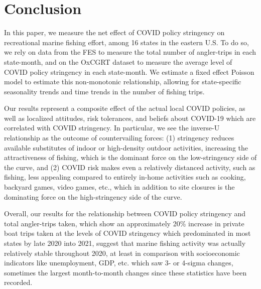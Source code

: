 \documentclass[12pt]{article}
\begin{document}
\section{Conclusion}

In this paper, we measure the net effect of COVID policy stringency on
recreational marine fishing effort, among 16 states in the eastern U.S.
To do so, we rely on data from the FES to measure the total number of
angler-trips in each state-month, and on the OxCGRT dataset to measure
the average level of COVID policy stringency in each state-month. We
estimate a fixed effect Poisson model to estimate this non-monotonic
relationship, allowing for state-specific seasonality trends and time
trends in the number of fishing trips.

Our results represent a composite effect of the actual local COVID
policies, as well as localized attitudes, risk tolerances, and beliefs
about COVID-19 which are correlated with COVID stringency. In
particular, we see the inverse-U relationship as the outcome of
countervailing forces: (1) stringency reduces available substitutes of
indoor or high-density outdoor activities, increasing the attractiveness
of fishing, which is the dominant force on the low-stringency side of
the curve, and (2) COVID risk makes even a relatively distanced
activity, such as fishing, less appealing compared to entirely in-home
activities such as cooking, backyard games, video games, etc., which in
addition to site closures is the dominating force on the high-stringency
side of the curve.

Overall, our results for the relationship between COVID policy
stringency and total angler-trips taken, which show an approximately
20\% increase in private boat trips taken at the levels of COVID
stringency which predominated in most states by late 2020 into 2021,
suggest that marine fishing activity was actually relatively stable
throughout 2020, at least in comparison with socioeconomic indicators
like unemployment, GDP, etc. which saw 3- or 4-sigma changes, sometimes
the largest month-to-month changes since these statistics have been
recorded.
\end{document}
